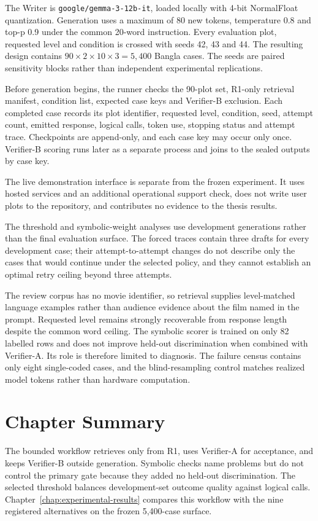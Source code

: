 The Writer is \texttt{google/gemma-3-12b-it}, loaded locally with 4-bit NormalFloat quantization. Generation uses a maximum of 80 new tokens, temperature 0.8 and top-p 0.9 under the common 20-word instruction. Every evaluation plot, requested level and condition is crossed with seeds 42, 43 and 44. The resulting design contains $90\times2\times10\times3=5{,}400$ Bangla cases. The seeds are paired sensitivity blocks rather than independent experimental replications.

Before generation begins, the runner checks the 90-plot set, R1-only retrieval manifest, condition list, expected case keys and Verifier-B exclusion. Each completed case records its plot identifier, requested level, condition, seed, attempt count, emitted response, logical calls, token use, stopping status and attempt trace. Checkpoints are append-only, and each case key may occur only once. Verifier-B scoring runs later as a separate process and joins to the sealed outputs by case key.

The live demonstration interface is separate from the frozen experiment. It uses hosted services and an additional operational support check, does not write user plots to the repository, and contributes no evidence to the thesis results.

The threshold and symbolic-weight analyses use development generations rather than the final evaluation surface. The forced traces contain three drafts for every development case; their attempt-to-attempt changes do not describe only the cases that would continue under the selected policy, and they cannot establish an optimal retry ceiling beyond three attempts.

The review corpus has no movie identifier, so retrieval supplies level-matched language examples rather than audience evidence about the film named in the prompt. Requested level remains strongly recoverable from response length despite the common word ceiling. The symbolic scorer is trained on only 82 labelled rows and does not improve held-out discrimination when combined with Verifier-A. Its role is therefore limited to diagnosis. The failure census contains only eight single-coded cases, and the blind-resampling control matches realized model tokens rather than hardware computation.

\section{Chapter Summary}

The bounded workflow retrieves only from R1, uses Verifier-A for acceptance, and keeps Verifier-B outside generation. Symbolic checks name problems but do not control the primary gate because they added no held-out discrimination. The selected threshold balances development-set outcome quality against logical calls. Chapter~\ref{chap:experimental-results} compares this workflow with the nine registered alternatives on the frozen 5,400-case surface.
